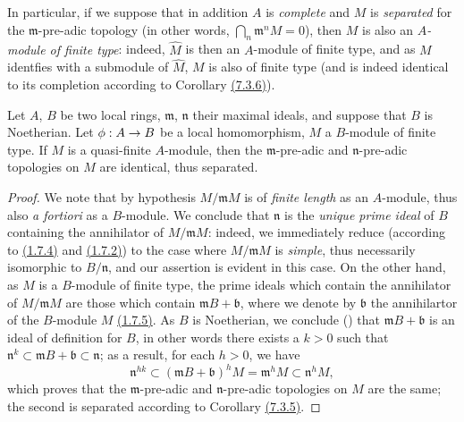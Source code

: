 In particular, if we suppose that in addition $A$ is {\em complete} and $M$ is
{\em separated} for the $\mathfrak{m}$-pre-adic topology (in other words,
$\bigcap_n\mathfrak{m}^n M=0$), then $M$ is also an {\em $A$-module of finite type}: indeed,
$\widehat{M}$ is then an $A$-module of finite type, and as $M$ identfies with a submodule of
$\widehat{M}$, $M$ is also of finite type (and is indeed identical to its completion
according to Corollary \hyperref[cor-0.7.3.6]{(7.3.6)}).

\begin{prop}[7.4.2]
\label{prop-0.7.4.2}
Let $A$, $B$ be two local rings, $\mathfrak{m}$, $\mathfrak{n}$ their maximal ideals, and
suppose that $B$ is Noetherian. Let $\phi:A\to B$ be a local homomorphism, $M$ a $B$-module
of finite type. If $M$ is a quasi-finite $A$-module, then the $\mathfrak{m}$-pre-adic and
$\mathfrak{n}$-pre-adic topologies on $M$ are identical, thus separated.
\end{prop}

\begin{proof}
\label{proof-prop-0.7.4.2}
We note that by hypothesis $M/\mathfrak{m}M$ is of {\em finite length} as an $A$-module,
thus also {\em a fortiori} as a $B$-module. We conclude that $\mathfrak{n}$ is the
{\em unique prime ideal} of $B$ containing the annihilator of $M/\mathfrak{m}M$: indeed, we
immediately reduce (according to \hyperref[env-0.1.7.4]{(1.7.4)} and
\hyperref[env-0.1.7.2]{(1.7.2)}) to the case where $M/\mathfrak{m}M$ is {\em simple}, thus
necessarily isomorphic to $B/\mathfrak{n}$, and our assertion is evident in this case. On
the other hand, as $M$ is a $B$-module of finite type, the prime ideals which contain the
annihilator of $M/\mathfrak{m}M$ are those which contain $\mathfrak{m}B+\mathfrak{b}$, where
we denote by $\mathfrak{b}$ the annihilartor of the $B$-module $M$
\hyperref[env-0.1.7.5]{(1.7.5)}. As $B$ is Noetherian, we conclude
(\cite[p.~127, Cor.~4]{I-11}) that $\mathfrak{m}B+\mathfrak{b}$ is an ideal
of definition for $B$, in other words there exists a $k>0$ such that
$\mathfrak{n}^k\subset\mathfrak{m}B+\mathfrak{b}\subset\mathfrak{n}$; as a result, for each
$h>0$, we have
\[
  \mathfrak{n}^{hk}\subset(\mathfrak{m}B+\mathfrak{b})^h M
  =\mathfrak{m}^h M\subset\mathfrak{n}^h M,
\]
which proves that the $\mathfrak{m}$-pre-adic and $\mathfrak{n}$-pre-adic topologies on $M$
are the same; the second is separated according to Corollary \hyperref[cor-0.7.3.5]{(7.3.5)}.
\end{proof}

